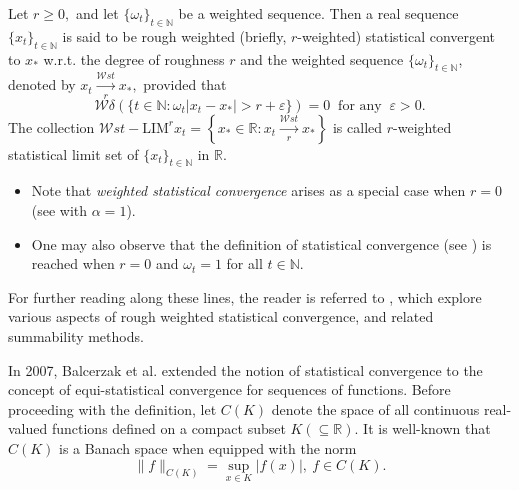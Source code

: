 \documentclass[reqno]{amsart}
\begin{document}
\begin{definition}\cite[Definition 3.3]{das2018characterization}\label{Def 1}\label{defrouwei}
	Let $r\geq 0,$ and let $\{\omega_t\}_{t\in\mathbb{N}}$ be a weighted sequence. Then a real sequence $\{x_t\}_{t\in\mathbb{N}}$  is said to be rough weighted (briefly, $r$-weighted) statistical convergent to $x_*$ w.r.t. the degree of roughness $r$ and the weighted sequence $\{\omega_t\}_{t\in\mathbb{N}}$, denoted by $x_t\xrightarrow[r]{\mathcal{W}st} x_*,$ provided that
$$\mathcal{W}\delta(\{t\in\mathbb{N}:\omega_t|x_t-x_*|> r+\varepsilon\})=0~\mbox{ for any }~\varepsilon>0.$$ 
The collection $\mathcal{W}st-\text{LIM}^rx_t=\left\{x_*\in \mathbb{R}:x_t\xrightarrow[r]{\mathcal{W}st} x_* \right\}$ is called $r$-weighted statistical limit set of $\{x_t\}_{t\in\mathbb{N}}$ in $\mathbb{R}$. 
\begin{itemize}
\item Note that \textit{weighted statistical convergence} arises as a special case when $r=0$ (see \cite[Definition 2.2]{ghosal2016weighted} with $\alpha=1$).
\item One may also observe that the definition of statistical convergence (see \cite{steinhaus1951convergence,tripathy1997statistically}) is reached when $r=0$ and $\omega_t=1$ for all $t\in\mathbb{N}$.
\end{itemize}
For further reading along these lines, the reader is referred to \cite{gho2019, Ghosal2020}, which explore various aspects of rough weighted statistical convergence, and related summability methods.
\end{definition}
In 2007, Balcerzak et al. \cite{balcerzak2007statistical} extended the notion of statistical convergence to the concept of equi-statistical convergence for sequences of functions. Before proceeding with the definition, 
let $C(K)$ denote the space of all continuous real-valued functions defined on a compact subset
$K(\subseteq\mathbb{R})$. It is well-known that $C(K)$ is a Banach space when equipped with the norm
$$
\|f\|_{C(K)}=\sup_{x\in K}|f(x)|,~f\in C(K).
$$ 
\end{document}
